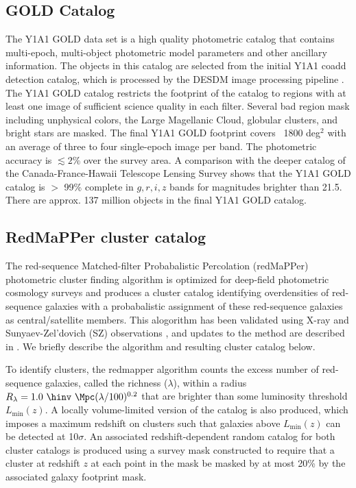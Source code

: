 \documentclass[fleqn,usenatbib]{mnras}
\begin{document}
\subsection{GOLD Catalog}
\label{sec:y1a1gold}
The Y1A1 GOLD data set \cite{} is a high quality photometric catalog that contains multi-epoch, multi-object photometric model parameters and other ancillary information. The objects in this catalog are selected from the initial Y1A1 coadd detection catalog, which is processed by the DESDM image processing pipeline \cite{2011arXiv1109.6741S,2008SPIE.7016E..0LM}. The Y1A1 GOLD catalog restricts the footprint of the catalog to regions with at least one image of sufficient science quality in each filter. Several bad region mask including unphysical colors, the Large Magellanic Cloud, globular clusters, and bright stars are masked. The final Y1A1 GOLD footprint covers ~1800 deg$^2$ with an average of three to four single-epoch image per band. The photometric accuracy is \(\lesssim 2 \%\) over the survey area. A comparison with the deeper catalog of the Canada-France-Hawaii Telescope Lensing Survey shows that the Y1A1 GOLD catalog is $>$ 99\% complete in $g,r,i,z$ bands for magnitudes brighter than 21.5. There are approx. 137 million objects in the final Y1A1 GOLD catalog.

\subsection{RedMaPPer cluster catalog}
\label{sec:redmapper} %

The red-sequence Matched-filter Probabalistic Percolation (redMaPPer) photometric cluster finding algorithm is optimized for deep-field photometric cosmology surveys \cite{2014ApJ...785..104R} and produces a cluster catalog identifying overdensities of red-sequence galaxies with a probabalistic assignment of these red-sequence galaxies as central/satellite members. This alogorithm has been validated using X-ray and Sunyaev-Zel'dovich (SZ) observations \cite{2015MNRAS.453...38R,2015MNRAS.454.2305S,2016MNRAS.461.1431R,2014A&A...571A..87S}, and updates to the method are described in \cite{2016MNRAS.461.1431R,2016ApJS..224....1R,2019MNRAS.482.1352M}. We briefly describe the algorithm and resulting cluster catalog below.

To identify clusters, the redmapper algorithm counts the excess number of red-sequence galaxies, called the richness ($\lambda$), within a radius $R_\lambda = 1.0\ \hinv\ \Mpc (\lambda/100)^{0.2}$ that are brighter than some luminosity threshold $L_{\mathrm{min}}(z)$. A locally volume-limited version of the catalog is also produced, which imposes a maximum redshift on clusters such that galaxies above $L_{\mathrm{min}}(z)$ can be detected at 10$\sigma$. An associated redshift-dependent random catalog for both cluster catalogs is produced using a survey mask constructed to require that a cluster at redshift $z$ at each point in the mask be masked by at most 20\% by the associated galaxy footprint mask.
\end{document}
